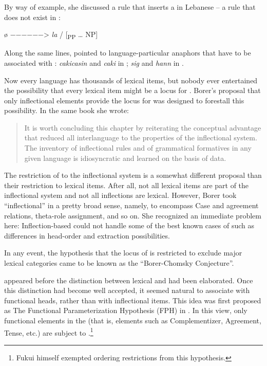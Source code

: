 \documentclass[output=paper,
modfonts
]{LSP/langsci}
\begin{document}
By way of example, she discussed a rule that inserts a  in
Lebanese   --  a rule that does not exist in :

\ea
ø −−−−−−\textgreater{} \emph{la} / {[}\textsubscript{PP} \ldots{}
NP{]}
\z

Along the same lines, \citet{manzini1987} pointed to
language-particular anaphors that have to be associated with :
\emph{cakicasin} and \emph{caki} in ; \emph{sig} and \emph{hann}
in .

Now every language has thousands of lexical items, but nobody ever
entertained the possibility that every lexical item might be a locus for
. Borer's proposal that only inflectional elements
provide the locus for  was designed to forestall
this possibility. In the same book she wrote:

\begin{quote}
It is worth concluding this chapter by reiterating the conceptual
advantage that reduced all interlanguage  to the properties of
the inflectional system. The inventory of inflectional rules and of
grammatical formatives in any given language is idiosyncratic and
learned on the basis of  data. \citep[29]{borer1984}
\end{quote}

The restriction of  to the inflectional system is a somewhat
different proposal than their restriction to lexical items. After all,
not all lexical items are part of the inflectional system and not all
inflections are lexical. However, Borer took ``inflectional'' in a pretty
broad sense, namely, to encompass Case and agreement relations,
theta-role assignment, and so on. She recognized an immediate problem
here: Inflection-based  could not handle some of the best
known cases of  such as differences in
head-order and extraction possibilities.

In any event, the hypothesis that the locus of  is
restricted to exclude major lexical categories came to be known as the
``Borer-Chomsky Conjecture''.

\citet{borer1984} appeared before the distinction between lexical and
 had been elaborated. Once this distinction had
become well accepted, it seemed natural to associate  with
functional heads, rather than with inflectional items. This idea was
first proposed as The Functional Parameterization Hypothesis (FPH) in
\citet{fukui1988}. In this view, only functional elements in the 
(that is, elements such as Complementizer, Agreement, Tense, etc.) are
subject to .\footnote{Fukui himself exempted
  ordering restrictions from this hypothesis.}
\end{document}

